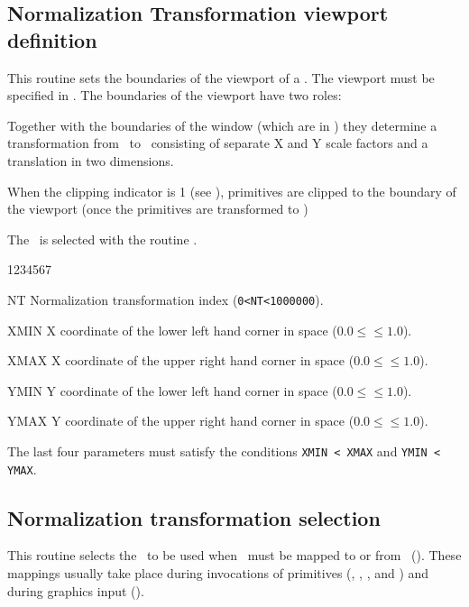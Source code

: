 \subsection{Normalization Transformation viewport definition}
\Action
This routine sets the boundaries of the viewport of a \NT. The viewport must be
specified in \NDC. The boundaries of the viewport have
two roles:
\begin{OL}
\item Together with the boundaries of the window (which are in \WC)
      they determine a transformation from \WC~to \NDC~consisting of
      separate X and Y scale factors and a translation in two dimensions.
\item When the clipping indicator is 1 (see ), primitives
      are clipped to the boundary of the viewport (once the primitives are
      transformed to \NDC)
\end{OL}
The \NT~is selected with the routine .
\Pdesc
\begin{DLtt}{1234567}
\item[NT]   Normalization transformation index ({\tt 0<NT<1000000}).
\item[XMIN] X coordinate of the lower left hand corner in \ndc{} space
            ($0.0 \leq $$\leq 1.0$).
\item[XMAX] X coordinate of the upper right hand corner in \ndc{} space
            ($0.0 \leq $$\leq 1.0$).
\item[YMIN] Y coordinate of the lower left hand corner in \ndc{} space
            ($0.0 \leq $$\leq 1.0$).
\item[YMAX] Y coordinate of the upper right hand corner in \ndc{} space
            ($0.0 \leq $$\leq 1.0$).
\end{DLtt}
The last four parameters must satisfy the conditions {\tt XMIN < XMAX} and
{\tt YMIN < YMAX}.
%
\subsection{Normalization transformation selection}
\Action
This routine selects the \NT~to be used when \WC~must be mapped
to or from \NDC~(\ndc). These mappings usually take
place during invocations of primitives (, , , and
) and during graphics input ().

